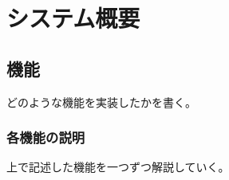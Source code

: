 \chapter{システム概要}
\label{cha:function}

\section{機能}
どのような機能を実装したかを書く。

\subsection{各機能の説明}
上で記述した機能を一つずつ解説していく。